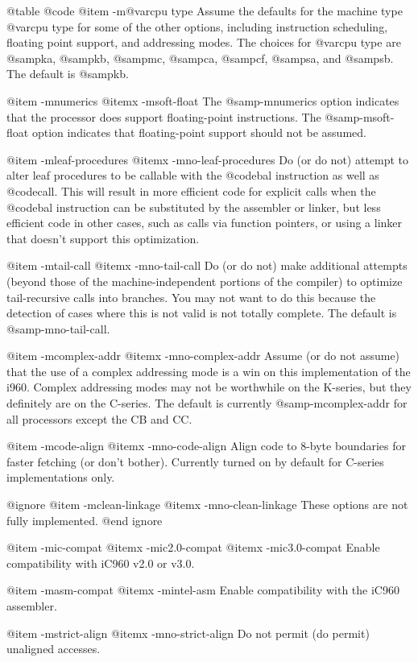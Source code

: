 {{@table @code
@item -m@var{cpu type}
Assume the defaults for the machine type @var{cpu type} for some of
the other options, including instruction scheduling, floating point
support, and addressing modes.  The choices for @var{cpu type} are
@samp{ka}, @samp{kb}, @samp{mc}, @samp{ca}, @samp{cf},
@samp{sa}, and @samp{sb}.
The default is
@samp{kb}.

@item -mnumerics
@itemx -msoft-float
The @samp{-mnumerics} option indicates that the processor does support
floating-point instructions.  The @samp{-msoft-float} option indicates
that floating-point support should not be assumed.

@item -mleaf-procedures
@itemx -mno-leaf-procedures
Do (or do not) attempt to alter leaf procedures to be callable with the
@code{bal} instruction as well as @code{call}.  This will result in more
efficient code for explicit calls when the @code{bal} instruction can be
substituted by the assembler or linker, but less efficient code in other
cases, such as calls via function pointers, or using a linker that doesn't
support this optimization.

@item -mtail-call
@itemx -mno-tail-call
Do (or do not) make additional attempts (beyond those of the
machine-independent portions of the compiler) to optimize tail-recursive
calls into branches.  You may not want to do this because the detection of
cases where this is not valid is not totally complete.  The default is
@samp{-mno-tail-call}.

@item -mcomplex-addr
@itemx -mno-complex-addr
Assume (or do not assume) that the use of a complex addressing mode is a
win on this implementation of the i960.  Complex addressing modes may not
be worthwhile on the K-series, but they definitely are on the C-series.
The default is currently @samp{-mcomplex-addr} for all processors except
the CB and CC.

@item -mcode-align
@itemx -mno-code-align
Align code to 8-byte boundaries for faster fetching (or don't bother).
Currently turned on by default for C-series implementations only.

@ignore
@item -mclean-linkage
@itemx -mno-clean-linkage
These options are not fully implemented.
@end ignore

@item -mic-compat
@itemx -mic2.0-compat
@itemx -mic3.0-compat
Enable compatibility with iC960 v2.0 or v3.0.

@item -masm-compat
@itemx -mintel-asm
Enable compatibility with the iC960 assembler.

@item -mstrict-align
@itemx -mno-strict-align
Do not permit (do permit) unaligned accesses.

}}
